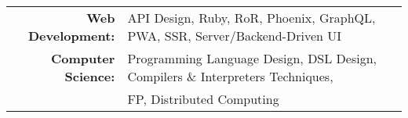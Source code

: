
\vspace{1em}
\begin{tabular}{rl}

    \textbf{Web Development:} & API Design, Ruby, RoR, Phoenix, GraphQL, PWA, SSR, Server/Backend-Driven UI \\
    \textbf{Computer Science:} & Programming Language Design, DSL Design, Compilers \& Interpreters Techniques,\\
                               & FP, Distributed Computing \\

\end{tabular}
